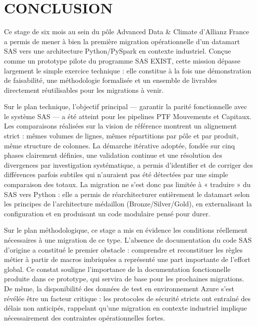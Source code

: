 \chapter*{CONCLUSION}

Ce stage de six mois au sein du pôle Advanced Data \& Climate d'Allianz France a permis de mener à bien la première migration opérationnelle d'un datamart SAS vers une architecture Python/PySpark en contexte industriel. Conçue comme un prototype pilote du programme SAS EXIST, cette mission dépasse largement le simple exercice technique : elle constitue à la fois une démonstration de faisabilité, une méthodologie formalisée et un ensemble de livrables directement réutilisables pour les migrations à venir.

Sur le plan technique, l’objectif principal — garantir la parité fonctionnelle avec le système SAS — a été atteint pour les pipelines PTF Mouvements et Capitaux. Les comparaisons réalisées sur la vision de référence montrent un alignement strict : mêmes volumes de lignes, mêmes répartitions par pôle et par produit, même structure de colonnes. La démarche itérative adoptée, fondée sur cinq phases clairement définies, une validation continue et une résolution des divergences par investigation systématique, a permis d’identifier et de corriger des différences parfois subtiles qui n’auraient pas été détectées par une simple comparaison des totaux. La migration ne s’est donc pas limitée à « traduire » du SAS vers Python : elle a permis de réarchitecturer entièrement le datamart selon les principes de l’architecture médaillon (Bronze/Silver/Gold), en externalisant la configuration et en produisant un code modulaire pensé pour durer.

Sur le plan méthodologique, ce stage a mis en évidence les conditions réellement nécessaires à une migration de ce type. L’absence de documentation du code SAS d’origine a constitué le premier obstacle : comprendre et reconstituer les règles métier à partir de macros imbriquées a représenté une part importante de l’effort global. Ce constat souligne l’importance de la documentation fonctionnelle produite dans ce prototype, qui servira de base pour les prochaines migrations. De même, la disponibilité des données de test en environnement Azure s’est révélée être un facteur critique : les protocoles de sécurité stricts ont entraîné des délais non anticipés, rappelant qu’une migration en contexte industriel implique nécessairement des contraintes opérationnelles fortes.

